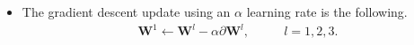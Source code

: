 \documentclass{tufte-handout}
\begin{document}
\begin{itemize}
where 
\begin{align*}
\partial \mathbf Z^1 = (\mathbf W^2)^T \mathbf d^2 
\end{align*}




\begin{align*}
\mathbf \partial \mathbf W^1 = \mathbf d^1 \mathbf x^T  \;\;\;\;\;\;\;\;\;\;\;\; (5,3) \leftarrow \; (5,1) \times (1,3) \\
\end{align*}

\item The gradient descent update using an $\alpha$ learning rate is the following.
\begin{align*}
\mathbf W^1 \leftarrow  \mathbf W^l- \alpha \partial \mathbf W^l,  \;\;\;\;\;\;\;\;\;\ l=1,2,3.
\end{align*}

\end{itemize}
\end{document}
